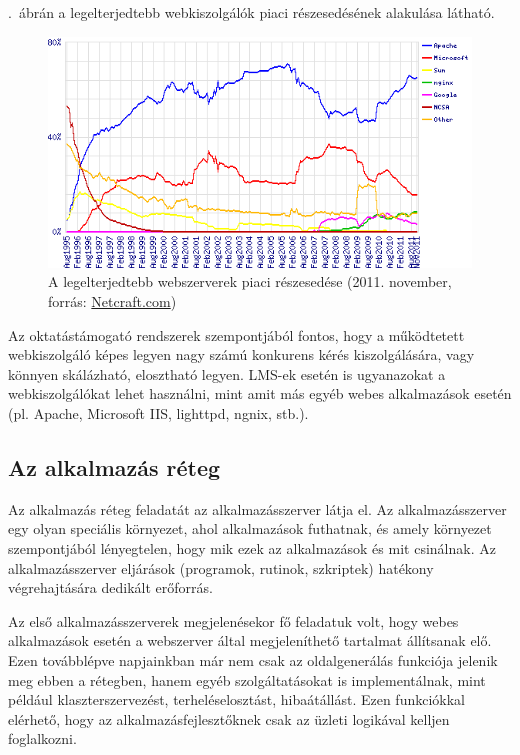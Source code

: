 .~ábrán a legelterjedtebb webkiszolgálók piaci részesedésének alakulása látható.

\begin{figure}[h!]
\centering
\includegraphics[width=1.0\textwidth]{figures/wpid-overallc.png}
\caption{A legelterjedtebb webszerverek piaci részesedése (2011. november, forrás: \href{http://news.netcraft.com/archives/2011/11/07/november-2011-web-server-survey.html}{Netcraft.com}) \label{fig:netcraft_webservers}}
\end{figure}

Az oktatástámogató rendszerek szempontjából fontos, hogy a működtetett webkiszolgáló képes legyen nagy számú konkurens kérés kiszolgálására, vagy könnyen skálázható, elosztható legyen. LMS-ek esetén is ugyanazokat a webkiszolgálókat lehet használni, mint amit más egyéb webes alkalmazások esetén (pl. Apache, Microsoft IIS, lighttpd, ngnix, stb.).
 
\subsection{Az alkalmazás réteg}
Az alkalmazás réteg feladatát az alkalmazásszerver látja el. Az alkalmazásszerver egy olyan speciális környezet, ahol alkalmazások futhatnak, és amely környezet szempontjából lényegtelen, hogy mik ezek az alkalmazások és mit csinálnak\cite{serverside}. Az alkalmazásszerver eljárások (programok, rutinok, szkriptek) hatékony végrehajtására dedikált erőforrás.

Az első alkalmazásszerverek megjelenésekor fő feladatuk volt, hogy webes alkalmazások esetén a webszerver által megjeleníthető tartalmat állítsanak elő. Ezen továbblépve napjainkban már nem csak az oldalgenerálás funkciója jelenik meg ebben a rétegben, hanem egyéb szolgáltatásokat is implementálnak, mint például klaszterszervezést, terheléselosztást, hibaátállást. Ezen funkciókkal elérhető, hogy az alkalmazásfejlesztőknek csak az üzleti logikával kelljen foglalkozni.

